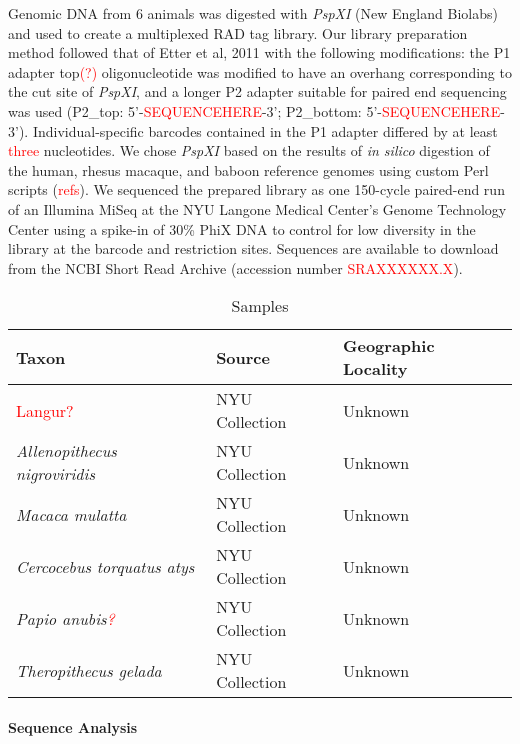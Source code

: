 \documentclass[12pt]{article}
\begin{document}
	Genomic DNA from 6 animals was digested with \emph{PspXI} (New England Biolabs) and used to create a multiplexed RAD tag library. Our library preparation method followed that of Etter et al, 2011 with the following modifications: the P1 adapter top\textcolor{red}{(?)} oligonucleotide was modified to have an overhang corresponding to the cut site of \emph{PspXI}, and a longer P2 adapter suitable for paired end sequencing was used (P2\_top: 5'-\textcolor{red}{SEQUENCEHERE}-3'; P2\_bottom: 5'-\textcolor{red}{SEQUENCEHERE}-3'). Individual-specific barcodes contained in the P1 adapter differed by at least \textcolor{red}{three} nucleotides. We chose \emph{PspXI} based on the results of \emph{in silico} digestion of the human, rhesus macaque, and baboon reference genomes using custom Perl scripts (\textcolor{red}{refs}). We sequenced the prepared library as one 150-cycle paired-end run of an Illumina MiSeq at the NYU Langone Medical Center's Genome Technology Center using a spike-in of 30\% PhiX DNA to control for low diversity in the library at the barcode and restriction sites. Sequences are available to download from the NCBI Short Read Archive (accession number \textcolor{red}{SRAXXXXXX.X}).

\begin{table}[h]
\caption{Samples}
\begin{center}
  \begin{tabular}{ l | l | l }
    \hline
    Taxon & Source & Geographic Locality \\ \hline\hline
    \textcolor{red}{Langur?} & NYU Collection & Unknown \\ \hline
    \emph{Allenopithecus nigroviridis} & NYU Collection & Unknown \\ \hline
    \emph{Macaca mulatta} & NYU Collection & Unknown \\ \hline
    \emph{Cercocebus torquatus atys} & NYU Collection & Unknown \\ \hline
    \emph{Papio anubis\textcolor{red}{?}} & NYU Collection & Unknown \\ \hline
    \emph{Theropithecus gelada} & NYU Collection & Unknown \\ 
    \hline
  \end{tabular}
\end{center}
\end{table}

\paragraph{Sequence Analysis}
\end{document}
